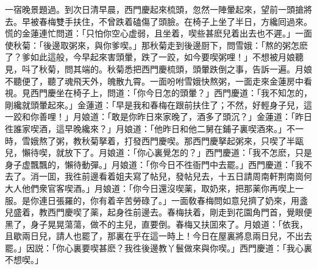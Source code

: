 一宿晚景題過。到次日清早晨，西門慶起來梳頭，忽然一陣暈起來，望前一頭搶將去。早被春梅雙手扶住，不曾跌着磕傷了頭臉。在椅子上坐了半日，方纔囘過來。慌的金蓮連忙問道：「只怕你空心虚弱，且坐着，喫些甚麽兒着出去也不遲。」一面使秋菊：「後邊取粥來，與你爹喫。」那秋菊走到後邊厨下，問雪娥：「熬的粥怎麽了？爹如此這般，今早起來害頭暈，跌了一跤，如今要喫粥哩！」不想被月娘聽見，呌了秋菊，問其端的。秋菊悉把西門慶梳頭，頭暈跌倒之事，告訴一遍。月娘不聽便了，聽了魂飛天外，魄散九霄。一面吩咐雪娥快熬粥，一面走來金蓮房中看視。見西門慶坐在椅子上，問道：「你今日怎的頭暈？」西門慶道：「我不知怎的，剛纔就頭暈起來。」金蓮道：「早是我和春梅在跟前扶住了；不然，好輕身子兒，這一跤和你善哩！」月娘道：「敢是你昨日來家晚了，酒多了頭沉？」金蓮道：「昨日徃誰家喫酒，這早晚纔來？」月娘道：「他昨日和他二舅在鋪子裏喫酒來。」不一時，雪娥熬了粥，教秋菊拏着，打發西門慶喫。那西門慶拏起粥來，只喫了半甌兒，懶待喫，就放下了。月娘道：「你心裏覺怎的？」西門慶道：「我不怎麽，只是身子虚飄飄的，懶待動彈。」月娘道：「你今日不徃衙門中去罷。」西門慶道：「我不去了。消一囬，我徃前邊看着姐夫寫了帖兒，發帖兒去，十五日請周南軒荆南崗何大人他們衆官客喫酒。」月娘道：「你今日還沒喫薬，取奶來，把那薬你再喫上一服。是你連日張羅的，你有着辛苦勞碌了。」一面敎春梅問如意兒擠了奶來，用盞兒盛着，教西門慶喫了薬，起身徃前邊去。春梅扶着，剛走到花園角門首，覺眼便黑了，身子晃晃蕩蕩，做不的主兒，直要倒。春梅又扶囬來了。月娘道：「依我，且歇兩日兒，請人也罷了，那裏在乎在這一時上！今日在屋裏將息兩日兒，不出去罷。」因説：「你心裏要喫甚麽？我徃後邊教丫鬟做來與你喫。」西門慶道：「我心裏不想喫。」

